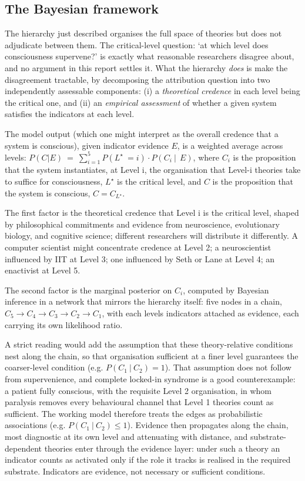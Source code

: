 \documentclass[11pt, a4paper, onecolumn, gdm]{google}
\begin{document}
\subsection{The Bayesian framework}\label{the-bayesian-framework}

The hierarchy just described organises the full space of theories but does not adjudicate between them.
The critical-level question: `at which level does consciousness supervene?' is exactly what reasonable researchers disagree about, and no argument in this report settles it.
What the hierarchy \emph{does} is make the disagreement tractable, by decomposing the attribution question into two independently assessable components: (i) a \emph{theoretical credence} in each level being the critical one, and (ii) an \emph{empirical assessment} of whether a given system satisfies the indicators at each level.

The model output (which one might interpret as the overall credence that a system is conscious), given indicator evidence \(E\), is a weighted average across levels: \(P(C|E)\  = \ \sum_{i = 1}^{5}P(L^{\star}\  = i) \cdot P(C_{i}\ |\ \ E)\), where \(C_{i}\) is the proposition that the system instantiates, at Level i, the organisation that Level-i theories take to suffice for consciousness, \(L^{\star}\) is the critical level, and \(C\) is the proposition that the system is conscious, \({C = C}_{L^{\star}}\).

The first factor is the theoretical credence that Level i is the critical level, shaped by philosophical commitments and evidence from neuroscience, evolutionary biology, and cognitive science; different researchers will distribute it differently.
A computer scientist might concentrate credence at Level 2; a neuroscientist influenced by IIT at Level 3; one influenced by Seth or Lane at Level 4; an enactivist at Level 5.

The second factor is the marginal posterior on \(C_{i}\), computed by Bayesian inference in a network that mirrors the hierarchy itself: five nodes in a chain, \(C_{5} \rightarrow C_{4} \rightarrow C_{3} \rightarrow C_{2} \rightarrow C_{1}\), with each level\textquotesingle s indicators attached as evidence, each carrying its own likelihood ratio.

A strict reading would add the assumption that these theory-relative conditions nest along the chain, so that organisation sufficient at a finer level guarantees the coarser-level condition (e.g. \(P(C_{1}\ |\ C_{2}) = 1\)).
That assumption does not follow from supervenience, and complete locked-in syndrome is a good counterexample: a patient fully conscious, with the requisite Level 2 organisation, in whom paralysis removes every behavioural channel that Level 1 theories count as sufficient.
The working model therefore treats the edges as probabilistic associations (e.g. \(P(C_{1}\ |\ C_{2}) \leq 1\)).
Evidence then propagates along the chain, most diagnostic at its own level and attenuating with distance, and substrate-dependent theories enter through the evidence layer: under such a theory an indicator counts as activated only if the role it tracks is realised in the required substrate.
Indicators are evidence, not necessary or sufficient conditions.
\end{document}
